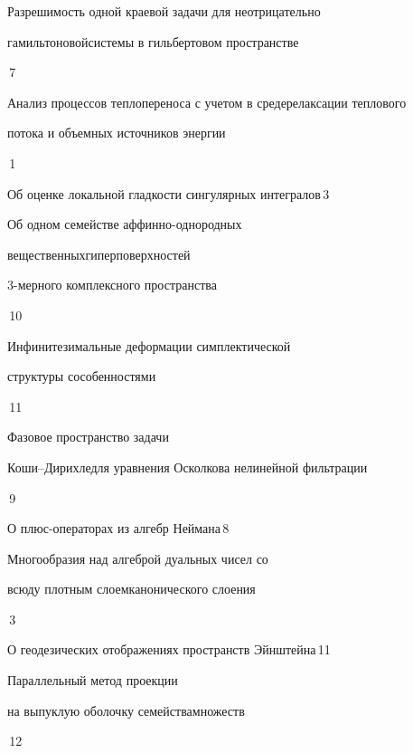 {Разрешимость одной краевой задачи для неотрицательно


гамильтоновой\newline системы в гильбертовом пространстве}{\No\,7}




{Анализ процессов теплопереноса с учетом в среде\newline релаксации теплового


потока и объемных источников энергии}{\No\,1}




{Об оценке локальной гладкости сингулярных интегралов}{\No\,3}




{Об одном семействе аффинно-однородных


вещественных\newline гиперповерхностей


3-мерного комплексного пространства}{\No\,10}




{Инфинитезимальные деформации симплектической


структуры с\newline особенностями}{\No\,11}




{Фазовое пространство задачи


Коши--Дирихле\newline для уравнения Осколкова нелинейной фильтрации}{\No\,9}




{О плюс-операторах из алгебр Неймана}{\No\,8}




{Многообразия над алгеброй дуальных чисел со 


всюду плотным слоем\newline канонического слоения}{\No\,3}




{О геодезических отображениях пространств Эйнштейна}{\No\,11}




{Параллельный метод проекции


на выпуклую оболочку семейства\newline множеств}{\No\,12}




